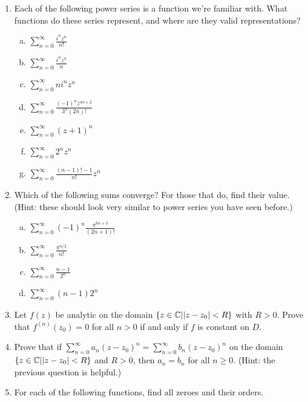 \begin{enumerate}
\item Each of the following power series is a function we're familiar with. What functions do these series represent, and where are they valid representations?

\begin{enumerate}[a)]
\item $\displaystyle\sum_{n = 0}^\infty \frac{i^nz^n}{n!}$
\item $\displaystyle\sum_{n = 0}^\infty \frac{i^nz^n}{n}$
\item $\displaystyle\sum_{n = 0}^\infty ni^nz^n$
\item $\displaystyle\sum_{n = 0}^\infty \frac{(-1)^nz^{4n + 2}}{3^n(2n)!}$
\item $\displaystyle\sum_{n = 0}^\infty (z + 1)^n$
\item $\displaystyle\sum_{n = 0}^\infty 2^nz^n$
\item $\displaystyle\sum_{n = 0}^\infty \frac{(n-1)! - 1}{n!}z^n$
\end{enumerate}

\item Which of the following sums converge? For those that do, find their value. (Hint: these should look very similar to power series you have seen before.)

\begin{enumerate}[a)]

\item $\displaystyle \sum_{n = 0}^\infty (-1)^n\frac{\pi^{6n+3}}{(2n+1)!} $
\item $\displaystyle \sum_{n = 0}^\infty \frac{\pi^{n/2}}{n!}$
\item $\displaystyle \sum_{n = 0}^\infty \frac{n-1}{2^n}$
\item $\displaystyle \sum_{n = 0}^\infty (n-1)2^n$
\end{enumerate}

\item Let $f(z)$ be analytic on the domain $\{z\in \mathbb{C}||z-z_0|< R\}$ with $R> 0$. Prove that  $f^{(n)}(z_0) = 0$ for all $n > 0$ if and only if $f$ is constant on $D$.

\item Prove that if $\sum_{n = 0}^\infty a_n(z-z_0)^n = \sum_{n = 0}^\infty b_n(z-z_0)^n$ on the domain $\{z\in \mathbb{C}| |z- z_0|< R\}$ and $R > 0$, then $a_n = b_n$ for all $n\ge 0$. (Hint: the previous question is helpful.)

\item For each of the following functions, find all zeroes and their orders.


\end{enumerate}
